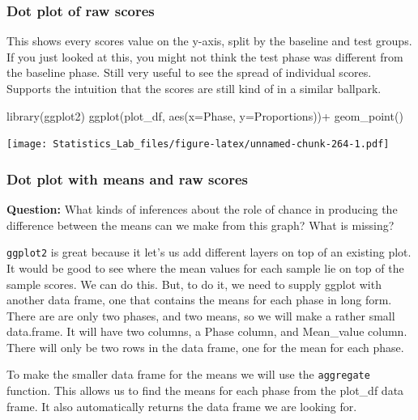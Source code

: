 \documentclass[
]{book}
\newenvironment{Shaded}{\begin{snugshade}}{\end{snugshade}}
\newcommand{\AttributeTok}[1]{\textcolor[rgb]{0.77,0.63,0.00}{#1}}
\newcommand{\FunctionTok}[1]{\textcolor[rgb]{0.00,0.00,0.00}{#1}}
\newcommand{\NormalTok}[1]{#1}
\newcommand{\SpecialCharTok}[1]{\textcolor[rgb]{0.00,0.00,0.00}{#1}}
\begin{document}
\hypertarget{dot-plot-of-raw-scores}{%
\subsubsection{Dot plot of raw scores}\label{dot-plot-of-raw-scores}}

This shows every scores value on the y-axis, split by the baseline and test groups. If you just looked at this, you might not think the test phase was different from the baseline phase. Still very useful to see the spread of individual scores. Supports the intuition that the scores are still kind of in a similar ballpark.

\begin{Shaded}
\begin{Highlighting}[]
\FunctionTok{library}\NormalTok{(ggplot2)}
\FunctionTok{ggplot}\NormalTok{(plot\_df, }\FunctionTok{aes}\NormalTok{(}\AttributeTok{x=}\NormalTok{Phase, }\AttributeTok{y=}\NormalTok{Proportions))}\SpecialCharTok{+}
  \FunctionTok{geom\_point}\NormalTok{()}
\end{Highlighting}
\end{Shaded}

\texttt{[image: Statistics\_Lab\_files/figure-latex/unnamed-chunk-264-1.pdf]}

\hypertarget{dot-plot-with-means-and-raw-scores}{%
\subsubsection{Dot plot with means and raw scores}\label{dot-plot-with-means-and-raw-scores}}

\textbf{Question:} What kinds of inferences about the role of chance in producing the difference between the means can we make from this graph? What is missing?

\texttt{ggplot2} is great because it let's us add different layers on top of an existing plot. It would be good to see where the mean values for each sample lie on top of the sample scores. We can do this. But, to do it, we need to supply ggplot with another data frame, one that contains the means for each phase in long form. There are are only two phases, and two means, so we will make a rather small data.frame. It will have two columns, a Phase column, and Mean\_value column. There will only be two rows in the data frame, one for the mean for each phase.

To make the smaller data frame for the means we will use the \texttt{aggregate} function. This allows us to find the means for each phase from the plot\_df data frame. It also automatically returns the data frame we are looking for.
\end{document}
